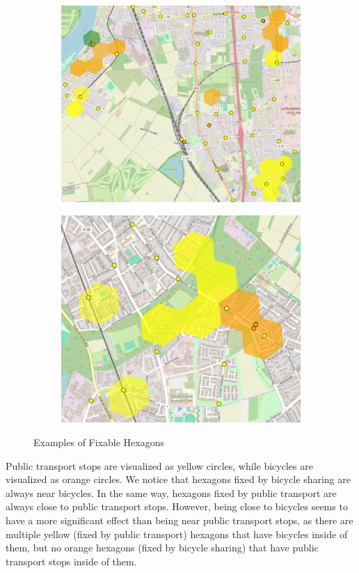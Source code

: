 \begin{figure}
\begin{subfigure}[b]{0.49\textwidth}
         \includegraphics[width=\textwidth]{Figures/results/problematic_hexagons/example_3.png}
     \end{subfigure}
     \hfill
     \begin{subfigure}[b]{0.49\textwidth}
         \centering
         \includegraphics[width=\textwidth]{Figures/results/problematic_hexagons/example_4.png}
     \end{subfigure}
     \caption{Examples of Fixable Hexagons}
        \label{fig:fixable_hexagons_examples}
\end{figure}
Public transport stops are visualized as yellow circles, while bicycles are visualized as orange circles.
We notice that hexagons fixed by bicycle sharing are always near bicycles.
In the same way, hexagons fixed by public transport are always close to public transport stops. 
However, being close to bicycles seems to have a more significant effect than being near public transport stops, as there are multiple yellow (fixed by public transport) hexagons that have bicycles inside of them, but no orange hexagons (fixed by bicycle sharing) that have public transport stops inside of them.

